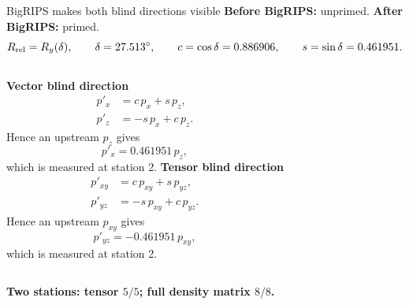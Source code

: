 \documentclass[aspectratio=169,11pt]{beamer}
\begin{document}
\begin{frame}{BigRIPS makes both blind directions visible}
  \textbf{Before BigRIPS:} unprimed.\qquad
  \textbf{After BigRIPS:} primed.
  \[
    R_{\rm rel}=R_y(\delta),
    \qquad \delta=27.513^\circ,
    \qquad c=\cos\delta=0.886906,
    \qquad s=\sin\delta=0.461951.
  \]

  \begin{columns}[T,onlytextwidth]
      \textbf{Vector blind direction}
      \begin{align*}
        p'_x&=c\,p_x+s\,p_z,\\
        p'_z&=-s\,p_x+c\,p_z.
      \end{align*}
      Hence an upstream $p_z$ gives
      \[
        \boxed{p'_x=0.461951\,p_z},
      \]
      which is measured at station 2.
      \textbf{Tensor blind direction}
      \begin{align*}
        p'_{xy}&=c\,p_{xy}+s\,p_{yz},\\
        p'_{yz}&=-s\,p_{xy}+c\,p_{yz}.
      \end{align*}
      Hence an upstream $p_{xy}$ gives
      \[
        \boxed{p'_{yz}=-0.461951\,p_{xy}},
      \]
      which is measured at station 2.
  \end{columns}

  \vspace{0.10em}
  {\color{Teal}\bfseries Two stations: tensor $5/5$; full density matrix $8/8$.}
\end{frame}
\end{document}
